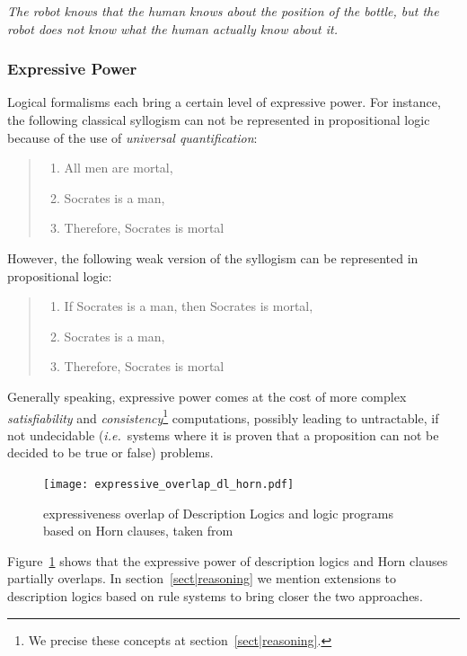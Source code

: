 \documentclass[a4paper, twocolumn]{article}
\newcommand{\ie}{{\textit{i.e.~}}}
\begin{document}
\emph{The robot knows that the human knows about the position of the bottle,
but the robot does not know what the human actually know about it.}

\subsubsection{Expressive Power}

Logical formalisms each bring a certain level of expressive power. For
instance, the following classical syllogism can not be represented in
propositional logic because of the use of \emph{universal quantification}:

\begin{quote}
\begin{enumerate}
    \item All men are mortal,
    \item Socrates is a man,
    \item Therefore, Socrates is mortal
\end{enumerate}
\end{quote}

However, the following weak version of the syllogism can be represented in
propositional logic:

\begin{quote}
\begin{enumerate}
    \item If Socrates is a man, then Socrates is mortal,
    \item Socrates is a man,
    \item Therefore, Socrates is mortal
\end{enumerate}
\end{quote}

Generally speaking, expressive power comes at the cost of more complex
\emph{satisfiability} and \emph{consistency}\footnote{We precise these concepts
at section~\ref{sect|reasoning}.} computations, possibly leading to
untractable, if not undecidable (\ie systems where it is proven that a
proposition can not be decided to be true or false) problems.

\begin{figure}
    \centering
    \texttt{[image: expressive\_overlap\_dl\_horn.pdf]}
    \caption{expressiveness overlap of Description Logics and logic programs
    based on Horn clauses, taken from~\cite{Grosof2003}}
    \label{fig|overlap_dl_horn}
\end{figure}

Figure~\ref{fig|overlap_dl_horn} shows that the expressive power of description
logics and Horn clauses partially overlaps. In section~\ref{sect|reasoning} we
mention extensions to description logics based on rule systems to bring closer
the two approaches.
\end{document}
